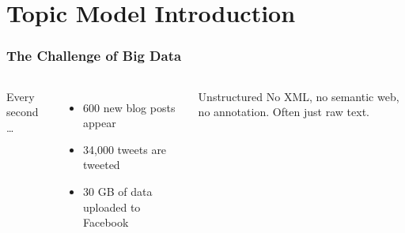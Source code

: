 

\providecommand{\graphscale}{0.6}


\newcommand{\dirfunc}[3]{ \frac{ \prod_{#1}^{#2} \g{ #3 } } { \g{ \sum_{#1}^{#2} #3 }}}
\newcommand{\dirnum}[4]{ \frac{\g{ #3 }}{#4} \prod_{#1}^{#2} }
\newcommand{\dirden}[3]{ \g{ \sum_{#1}^{#2} #3 } }

\section{Topic Model Introduction}



\begin{frame}
\frametitle{The Challenge of Big Data}

\begin{columns}


Every second \dots
\begin{itemize}
  \item 600 new blog posts appear
  \item 34,000 tweets are tweeted
  \item 30 GB of data uploaded to Facebook
\end{itemize}
\pause

\begin{block}{Unstructured}
  No XML, no semantic web, no annotation.  Often just raw text.
\end{block}



\end{columns}

\end{frame}

